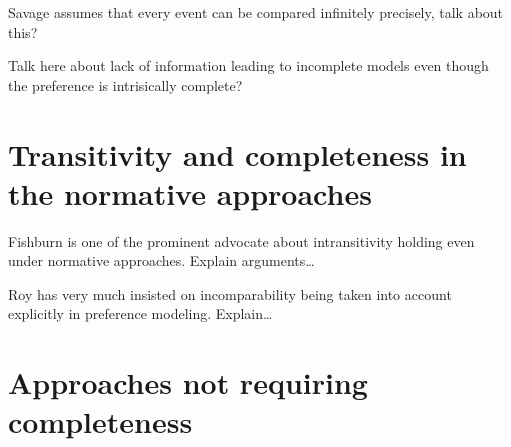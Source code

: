 \documentclass[french, english]{llncs}
\begin{document}
Savage assumes that every event can be compared infinitely precisely, talk about this?

Talk here about lack of information leading to incomplete models even though the preference is intrisically complete?

\section{Transitivity and completeness in the normative approaches}
Fishburn is one of the prominent advocate about intransitivity holding even under normative approaches. Explain arguments…

Roy has very much insisted on incomparability being taken into account explicitly in preference modeling. Explain…

\section{Approaches not requiring completeness}
\end{document}
